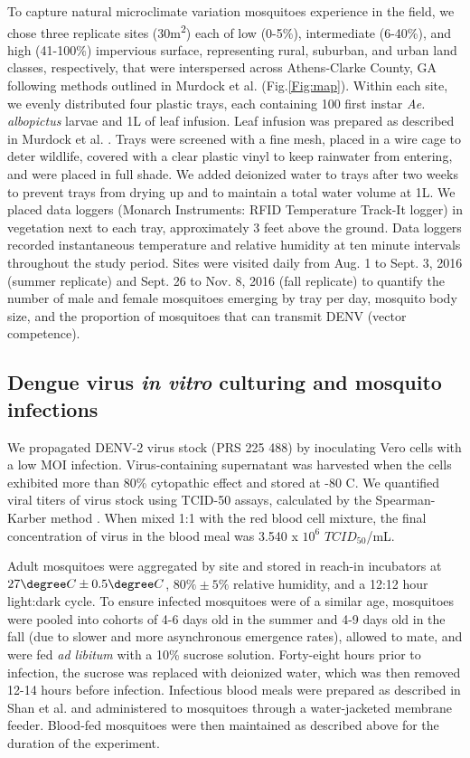 \documentclass{bmcart}
\begin{document}
To capture natural microclimate variation mosquitoes experience in the field, we chose three replicate sites (30m\textsuperscript{2}) each of low (0-5\%), intermediate (6-40\%), and high (41-100\%) impervious surface, representing rural, suburban, and urban land classes, respectively, that were interspersed across Athens-Clarke County, GA following methods outlined in Murdock et al. \citep{murdock2017} (Fig.\ref{Fig:map}).
Within each site, we evenly distributed four plastic trays, each containing 100 first instar \textit{Ae. albopictus} larvae and 1L of leaf infusion.
Leaf infusion was prepared as described in Murdock et al. \citep{murdock2017}.
Trays were screened with a fine mesh, placed in a wire cage to deter wildlife, covered with a clear plastic vinyl to keep rainwater from entering, and were placed in full shade.
We added deionized water to trays after two weeks to prevent trays from drying up and to maintain a total water volume at 1L.
We placed data loggers (Monarch Instruments: RFID Temperature Track-It logger) in vegetation next to each tray, approximately 3 feet above the ground.
Data loggers recorded instantaneous temperature and relative humidity at ten minute intervals throughout the study period.
Sites were visited daily from Aug. 1 to Sept. 3, 2016 (summer replicate) and Sept. 26 to Nov. 8, 2016 (fall replicate) to quantify the number of male and female mosquitoes emerging by tray per day, mosquito body size, and the proportion of mosquitoes that can transmit DENV (vector competence).

\subsection*{Dengue virus \textit{in vitro} culturing and mosquito infections}

We propagated DENV-2 virus stock (PRS 225 488) by inoculating Vero cells with a low MOI infection.
Virus-containing supernatant was harvested when the cells exhibited more than 80\% cytopathic effect and stored at -80 \degree C.
We quantified viral titers of virus stock using TCID-50 assays, calculated by the Spearman-Karber method \citep{shao2016}.
When mixed 1:1 with the red blood cell mixture, the final concentration of virus in the blood meal was 3.540 x $10^6$ $TCID_{50}$/mL.

Adult mosquitoes were aggregated by site and stored in reach-in incubators at $27 \degree C \pm 0.5 \degree C$, $80\% \pm 5\%$ relative humidity, and a 12:12 hour light:dark cycle.
To ensure infected mosquitoes were of a similar age, mosquitoes were pooled into cohorts of 4-6 days old in the summer and 4-9 days old in the fall (due to slower and more asynchronous emergence rates), allowed to mate, and were fed \textit{ad libitum} with a 10\% sucrose solution.
Forty-eight hours prior to infection, the sucrose was replaced with deionized water, which was then removed 12-14 hours before infection.
Infectious blood meals were prepared as described in Shan et al. \citep{shan2016} and administered to mosquitoes through a water-jacketed membrane feeder.
Blood-fed mosquitoes were then maintained as described above for the duration of the experiment.
\end{document}
